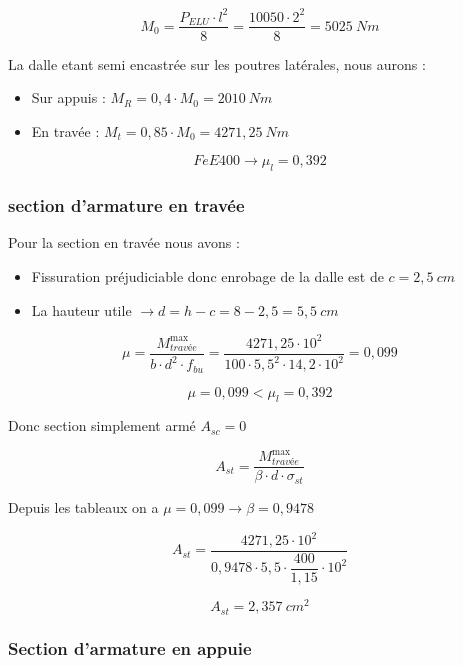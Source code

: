 \documentclass[12pt,a4paper]{article}
\begin{document}
	\[ M_{0}  =  \dfrac{P_{ELU} \cdot l^{2}}{8}  =  \dfrac{10050 \cdot 2^{2}}{8}  =  5025 ~\unit{Nm} \]
	
	La dalle etant semi encastrée sur les poutres latérales, nous aurons : 
	
	\begin{itemize}
		\item Sur appuis : $ M_{R}  =  0,4 \cdot M_{0} = 2010 ~\unit{Nm} $
		\item En travée : $ M_{t} = 0,85 \cdot M_{0} = 4271,25 ~\unit{Nm} $
	\end{itemize}
	
	\vspace{\baselineskip}
	
	\[ FeE400 \rightarrow \mu_{l}  = 0,392 \]
	
	
	\vspace{\baselineskip}
	
	\subsubsection{section d'armature en travée}
	
	Pour la section en travée nous avons :
	
	\begin{itemize}
		\item Fissuration préjudiciable donc enrobage de la dalle est de $ c  =  2,5 ~\unit{cm} $
		\item La hauteur utile $ \rightarrow d = h - c = 8 - 2,5 = 5,5 ~\unit{cm} $
	\end{itemize}
	
	
	\[ \mu  = \dfrac{M^{\max}_{travée}}{b \cdot d^{2} \cdot f_{bu}}  = \dfrac{4271,25 \cdot 10^{2}}{100 \cdot 5,5^{2} \cdot 14,2 \cdot 10^{2}}  = 0,099 \]
	
	\[ \mu  = 0,099 < \mu_{l}  = 0,392 \]
	
	Donc section simplement armé $ A_{sc}  = 0 $
	
	\[ A_{st}  = \dfrac{M^{\max}_{travée}}{\beta \cdot d \cdot \sigma_{st}} \]
	
	Depuis les tableaux on a $ \mu  =  0,099 \rightarrow \beta = 0,9478 $
	
	\[ A_{st}  =  \dfrac{4271,25 \cdot 10^{2}}{0,9478 \cdot 5,5 \cdot \dfrac{400}{1,15} \cdot 10^{2}} \]
	
	\[ A_{st}  =  2,357 ~\unit{cm^{2}} \]
	
	\vspace{\baselineskip}
	
	\subsubsection{Section d'armature en appuie}
	
\end{document}
